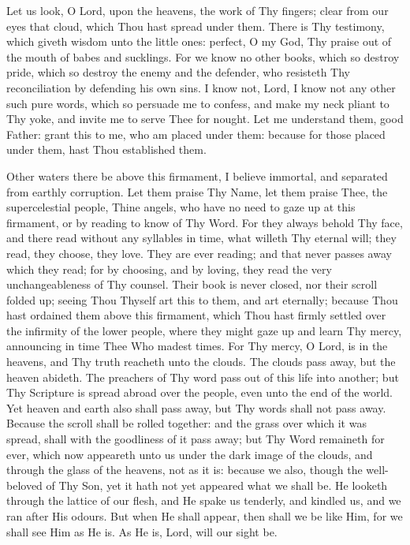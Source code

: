 \documentclass[b5paper,openright,12pt,twoside]{book}
\begin{document}
Let us look, O Lord, upon the heavens, the work of Thy fingers; clear
from our eyes that cloud, which Thou hast spread under them. There is
Thy testimony, which giveth wisdom unto the little ones: perfect, O my
God, Thy praise out of the mouth of babes and sucklings. For we know no
other books, which so destroy pride, which so destroy the enemy and the
defender, who resisteth Thy reconciliation by defending his own sins. I
know not, Lord, I know not any other such pure words, which so persuade
me to confess, and make my neck pliant to Thy yoke, and invite me to
serve Thee for nought. Let me understand them, good Father: grant this
to me, who am placed under them: because for those placed under them,
hast Thou established them.

Other waters there be above this firmament, I believe immortal, and
separated from earthly corruption. Let them praise Thy Name, let them
praise Thee, the supercelestial people, Thine angels, who have no need
to gaze up at this firmament, or by reading to know of Thy Word. For
they always behold Thy face, and there read without any syllables in
time, what willeth Thy eternal will; they read, they choose, they love.
They are ever reading; and that never passes away which they read; for
by choosing, and by loving, they read the very unchangeableness of Thy
counsel. Their book is never closed, nor their scroll folded up; seeing
Thou Thyself art this to them, and art eternally; because Thou hast
ordained them above this firmament, which Thou hast firmly settled over
the infirmity of the lower people, where they might gaze up and learn
Thy mercy, announcing in time Thee Who madest times. For Thy mercy, O
Lord, is in the heavens, and Thy truth reacheth unto the clouds. The
clouds pass away, but the heaven abideth. The preachers of Thy word pass
out of this life into another; but Thy Scripture is spread abroad over
the people, even unto the end of the world. Yet heaven and earth also
shall pass away, but Thy words shall not pass away. Because the scroll
shall be rolled together: and the grass over which it was spread, shall
with the goodliness of it pass away; but Thy Word remaineth for ever,
which now appeareth unto us under the dark image of the clouds, and
through the glass of the heavens, not as it is: because we also, though
the well-beloved of Thy Son, yet it hath not yet appeared what we
shall be. He looketh through the lattice of our flesh, and He spake us
tenderly, and kindled us, and we ran after His odours. But when He shall
appear, then shall we be like Him, for we shall see Him as He is. As He
is, Lord, will our sight be.
\end{document}
